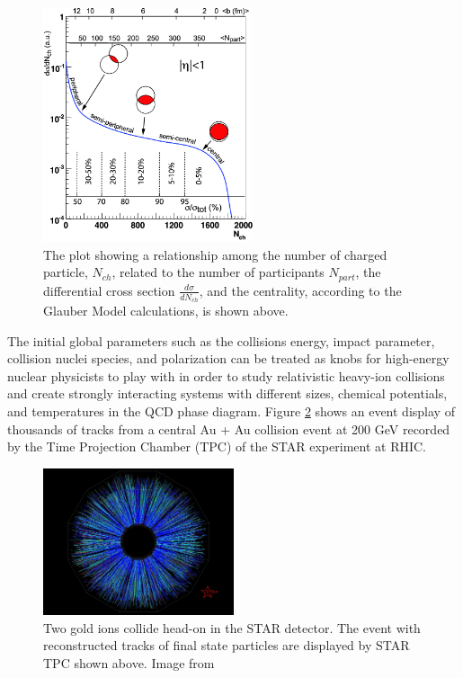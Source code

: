 \begin{figure}[hbtp]
\begin{center}
\includegraphics[width=0.55\textwidth]{Figures/Chapter1/CentDefPlot.png}
\caption{The plot showing a relationship among the number of charged particle, $N_{ch}$, related to the number of participants $N_{part}$, the differential cross section $\frac{d\sigma}{dN_{ch}}$, and the centrality, according to the Glauber Model calculations, is shown above.}
\label{CentDefPlot}
\end{center}
\end{figure} 


The initial global parameters such as the collisions energy, impact parameter, collision nuclei species, and polarization can be treated as knobs for high-energy nuclear physicists to play with in order to study relativistic heavy-ion collisions and create strongly interacting systems with different sizes, chemical potentials, and temperatures in the QCD phase diagram. Figure \ref{STAREvtDisplay} shows an event display of thousands of tracks from a central Au + Au collision event at 200 GeV recorded by the Time Projection Chamber (TPC) of the STAR experiment at RHIC.


\begin{figure}[hbtp]
\begin{center}
\includegraphics[width=0.50\textwidth]{Figures/Chapter1/STAREvtDisplay.png}
\caption{Two gold ions collide head-on in the STAR detector. The event with reconstructed tracks of final state particles are displayed by STAR TPC shown above. Image from \cite{STARTPC}}
\label{STAREvtDisplay}
\end{center}
\end{figure} 



